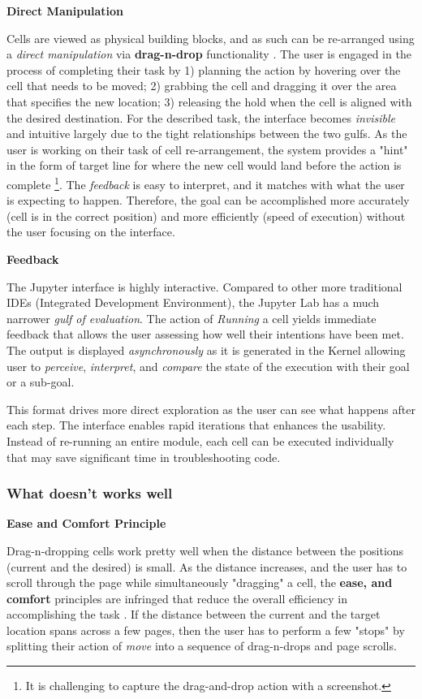 \documentclass[12pt,letterpaper]{article}
\begin{document}
\textbf{Direct Manipulation}

Cells are viewed as physical building blocks, and as such can be re-arranged using a \textit{direct manipulation} via \textbf{drag-n-drop} functionality \cite{frohlich1997direct}. The user is engaged in the process of completing their task by 1) planning the action by hovering over the cell that needs to be moved; 2) grabbing the cell and dragging it over the area that specifies the new location; 3) releasing the hold when the cell is aligned with the desired destination. For the described task, the interface becomes \textit{invisible} and intuitive largely due to the tight relationships between the two gulfs. As the user is working on their task of cell re-arrangement, the system provides a "hint" in the form of target line for where the new cell would land before the action is complete \footnote{It is challenging to capture the drag-and-drop action with a screenshot.}. The \textit{feedback} is easy to interpret, and it matches with what the user is expecting to happen. Therefore, the goal can be accomplished more accurately (cell is in the correct position) and more efficiently (speed of execution) without the user focusing on the interface.

\textbf{Feedback}

The Jupyter interface is highly interactive. Compared to other more traditional IDEs (Integrated Development Environment), the Jupyter Lab has a much narrower \textit{gulf of evaluation}. The action of \textit{Running} a cell yields immediate feedback that allows the user assessing how well their intentions have been met. The output is displayed \textit{asynchronously} as it is generated in the Kernel allowing user to \textit{perceive}, \textit{interpret}, and \textit{compare} the state of the execution with their goal or a sub-goal. 

This format drives more direct exploration as the user can see what happens after each step. The interface enables rapid iterations that enhances the usability. Instead of re-running an entire module, each cell can be executed individually that may save significant time in troubleshooting code. 

\subsubsection*{What doesn't works well}

\textbf{Ease and Comfort Principle}

Drag-n-dropping cells work pretty well when the distance between the positions (current and the desired) is small. As the distance increases, and the user has to scroll through the page while simultaneously "dragging" a cell, the \textbf{ease, and comfort} principles are infringed that reduce the overall efficiency in accomplishing the task \cite{story1998universal}. If the distance between the current and the target location spans across a few pages, then the user has to perform a few "stops" by splitting their action of \textit{move} into a sequence of drag-n-drops and page scrolls. 
\end{document}
